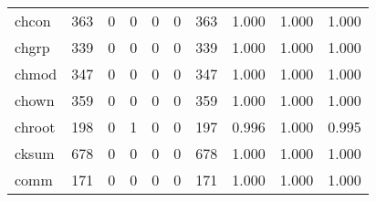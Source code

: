 \begin{longtable}{lp{1.3cm}p{1.3cm}p{1.3cm}p{1.3cm}p{1.3cm}p{1.3cm}p{1.3cm}p{1.3cm}p{1.3cm}}
chcon     &                    363 &                                  0 &                                 0 &                                0 &                                 0 &                             363 &                                   1.000 &                                  1.000 &                                1.000 \\
chgrp     &                    339 &                                  0 &                                 0 &                                0 &                                 0 &                             339 &                                   1.000 &                                  1.000 &                                1.000 \\
chmod     &                    347 &                                  0 &                                 0 &                                0 &                                 0 &                             347 &                                   1.000 &                                  1.000 &                                1.000 \\
chown     &                    359 &                                  0 &                                 0 &                                0 &                                 0 &                             359 &                                   1.000 &                                  1.000 &                                1.000 \\
chroot    &                    198 &                                  0 &                                 1 &                                0 &                                 0 &                             197 &                                   0.996 &                                  1.000 &                                0.995 \\
cksum     &                    678 &                                  0 &                                 0 &                                0 &                                 0 &                             678 &                                   1.000 &                                  1.000 &                                1.000 \\
comm      &                    171 &                                  0 &                                 0 &                                0 &                                 0 &                             171 &                                   1.000 &                                  1.000 &                                1.000 \\

\end{longtable}

